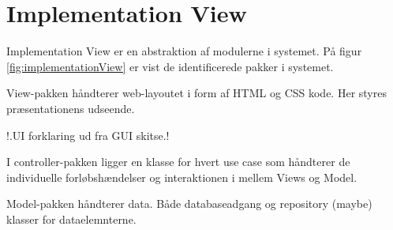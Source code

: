 \section{Implementation View}
Implementation View er en abstraktion af modulerne i systemet. På figur \ref{fig:implementationView} er vist de identificerede pakker i systemet.


View-pakken håndterer web-layoutet i form af HTML og CSS kode. Her styres præsentationens udseende.

!.UI forklaring ud fra GUI skitse.!

I controller-pakken ligger en klasse for hvert use case som håndterer de individuelle forløbshændelser og interaktionen i mellem Views og Model.

Model-pakken håndterer data. Både databaseadgang og repository (maybe) klasser for dataelemnterne.